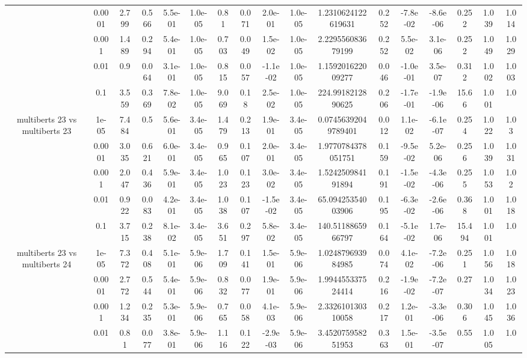 \begin{tabular}{|c|c|c|c|c|c|c|c|c|c|c|c|c|c|c|c|c|}
 & 0.0001 & 2.799 & 0.566 & 5.5e-01 & 1.0e-05 & 0.81 & 0.071 & 2.0e-01 & 1.0e-05 & 1.2310624122619631 & 0.252 & -7.8e-02 & -8.6e-06 & 0.252 & 1.039 & 1.014 \\
 & 0.001 & 1.489 & 0.294 & 5.4e-01 & 1.0e-05 & 0.703 & 0.049 & 1.5e-02 & 1.0e-05 & 2.229556083679199 & 0.252 & 5.5e-02 & 3.1e-06 & 0.252 & 1.049 & 1.029 \\
 & 0.01 & 0.9 & 0.064 & 3.1e-01 & 1.0e-05 & 0.815 & 0.057 & -1.1e-02 & 1.0e-05 & 1.159201622009277 & 0.046 & -1.0e-01 & 3.5e-07 & 0.312 & 1.002 & 1.003 \\
 & 0.1 & 3.559 & 0.369 & 7.8e-02 & 1.0e-05 & 9.069 & 0.18 & 2.5e-02 & 1.0e-05 & 224.9918212890625 & 0.206 & -1.7e-01 & -1.9e-06 & 15.66 & 1.001 & 1.0 \\
\hline
\multirow{5}{*}{multiberts 23 vs multiberts 23} & 1e-05 & 7.484 & 0.5 & 5.6e-01 & 3.4e-05 & 1.479 & 0.213 & 1.9e-01 & 3.4e-05 & 0.07456392049789401 & 0.012 & 1.1e-02 & -6.1e-07 & 0.254 & 1.022 & 1.03 \\
 & 0.0001 & 3.035 & 0.621 & 6.0e-01 & 3.4e-05 & 0.965 & 0.107 & 2.0e-01 & 3.4e-05 & 1.9770784378051751 & 0.159 & -9.5e-02 & 5.2e-06 & 0.256 & 1.039 & 1.031 \\
 & 0.001 & 2.047 & 0.436 & 5.9e-01 & 3.4e-05 & 1.023 & 0.123 & 3.0e-02 & 3.4e-05 & 1.524250984191894 & 0.191 & -1.5e-02 & -4.3e-06 & 0.255 & 1.053 & 1.02 \\
 & 0.01 & 0.922 & 0.083 & 4.2e-01 & 3.4e-05 & 1.038 & 0.107 & -1.5e-02 & 3.4e-05 & 65.09425354003906 & 0.195 & -6.3e-02 & -2.6e-06 & 0.368 & 1.001 & 1.018 \\
 & 0.1 & 3.715 & 0.238 & 8.1e-02 & 3.4e-05 & 3.651 & 0.297 & 5.8e-02 & 3.4e-05 & 140.5118865966797 & 0.164 & -5.1e-02 & 1.7e-06 & 15.494 & 1.001 & 1.0 \\
\hline
\multirow{5}{*}{multiberts 23 vs multiberts 24} & 1e-05 & 7.372 & 0.408 & 5.1e-01 & 5.9e-06 & 1.709 & 0.141 & 1.5e-01 & 5.9e-06 & 1.024879693984985 & 0.074 & 4.1e-02 & -7.2e-06 & 0.251 & 1.056 & 1.018 \\
 & 0.0001 & 2.772 & 0.544 & 5.4e-01 & 5.9e-06 & 0.832 & 0.077 & 1.9e-01 & 5.9e-06 & 1.994455337524414 & 0.216 & -1.9e-02 & -7.2e-07 & 0.27 & 1.034 & 1.023 \\
 & 0.001 & 1.234 & 0.235 & 5.3e-01 & 5.9e-06 & 0.765 & 0.058 & 4.1e-03 & 5.9e-06 & 2.332610130310058 & 0.217 & 1.2e-01 & -3.3e-06 & 0.306 & 1.045 & 1.036 \\
 & 0.01 & 0.81 & 0.077 & 3.8e-01 & 5.9e-06 & 1.116 & 0.122 & -2.9e-03 & 5.9e-06 & 3.452075958251953 & 0.363 & 1.5e-01 & -3.5e-07 & 0.55 & 1.005 & 1.0 \\

\end{tabular}

